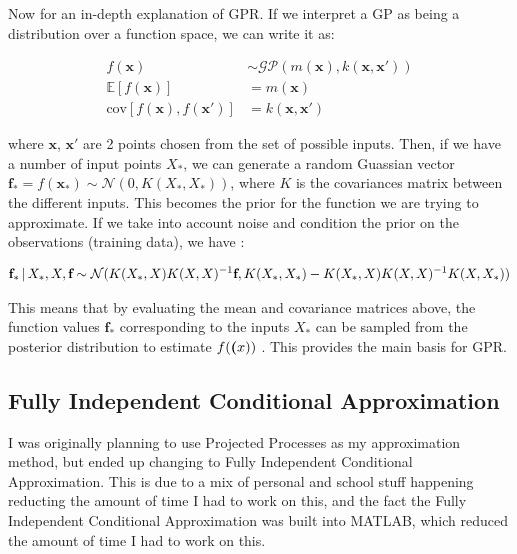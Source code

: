 \documentclass{article}
\newcommand{\vbar}{\hspace{-0.4mm} \mathrel{|} \hspace{-0.4mm}}
\begin{document}
    Now for an in-depth explanation of GPR. If we interpret a GP as being a distribution over
    a function space, we can write it as:
    
    \begin{align*}
        f(\textbf{x})                             &\sim \mathcal{GP}(m(\textbf{x}), k(\textbf{x}, \textbf{x}')) \\
        \mathbb{E}[f(\textbf{x})]                 &= m(\textbf{x})                                           \\
        \text{cov}[f(\textbf{x}), f(\textbf{x}')] &= k(\textbf{x}, \textbf{x}')
    \end{align*}
    
    where $\textbf{x}$, $\textbf{x}'$ are 2 points chosen from the set of possible inputs. Then,
    if we have a number of input points $X_{*}$, we can generate a random Guassian vector
    $\textbf{f}_{*} = f(\textbf{x}_{*}) \sim \mathcal{N}(0, K(X_{*}, X_{*}))$, where $K$ is the
    covariances matrix between the different inputs. This becomes the prior for the function
    we are trying to approximate. If we take into account noise and condition the prior on the
    observations (training data), we have \citep{gpml}:
    
    \begin{align*}
        \textbf{f}_{*} \vbar X_{*}, X, \textbf{f} \sim \mathcal{N}(K(X_{*}, X)K(X, X)^{-1} \textbf{f}, K(X_{*}, X_{*}) - K(X_{*}, X)K(X, X)^{-1} K(X, X_{*}))
    \end{align*}
    
    This means that by evaluating the mean and covariance matrices above, the function values
    $\textbf{f}_{*}$ corresponding to the inputs $X_{*}$ can be sampled from the posterior
    distribution to estimate $f(\textbf(x))$ \citep{gpml}. This provides the main basis for GPR.
    
    \subsection{Fully Independent Conditional Approximation}
    
    I was originally planning to use Projected Processes as my approximation method, but ended up
    changing to Fully Independent Conditional Approximation. This is due to a mix of personal
    and school stuff happening reducting the amount of time I had to work on this, and the fact
    the Fully Independent Conditional Approximation was built into MATLAB, which reduced the amount
    of time I had to work on this.
    
\end{document}
